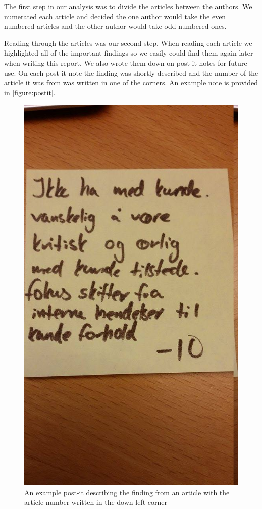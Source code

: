 \documentclass[12pt]{article}
\begin{document}
The first step in our analysis was to divide the articles between the authors. We numerated each article and decided the one author would take the even numbered articles and the other author would take odd numbered ones. 

Reading through the articles was our second step. When reading each article we highlighted all of the important findings so we easily could find them again later when writing this report. We also wrote them down on post-it notes for future use. On each post-it note the finding was shortly described and the number of the article it was from was written in one of the corners. An example note is provided in \autoref{figure:postit}.

\begin{figure}[h!]
	\centering
	\includegraphics[height=0.5\textheight]{figures/postit.jpg}
	\caption{An example post-it describing the finding from an article with the article number written in the down left corner}
	\label{figure:postit}
\end{figure}
\end{document}
